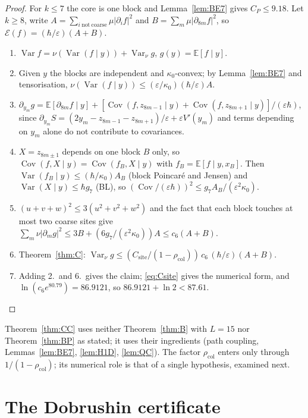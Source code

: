 \documentclass[11pt,a4paper]{article}
\theoremstyle{definition}
\theoremstyle{remark}
\newcommand{\E}{\mathbb{E}}
\newcommand{\Var}{\operatorname{Var}}
\newcommand{\Cov}{\operatorname{Cov}}
\newcommand{\cE}{\mathcal{E}}
\newcommand{\rcol}{\rho_{\mathrm{col}}}
\newcommand{\Csite}{C_{\mathrm{site}}}
\begin{document}
\begin{proof}
For $k\le7$ the core is one block and Lemma~\ref{lem:BE7} gives $C_P\le9.18$. Let $k\ge8$, write $A=\sum_{i\ \mathrm{not\ coarse}}\mu|\partial_if|^2$ and $B=\sum_m\mu|\partial_{8m}f|^2$, so $\cE(f)=(\hbar/\varepsilon)(A+B)$.
\begin{enumerate}[leftmargin=*,label=\arabic*.]
\item $\Var f=\nu(\Var(f\mid y))+\Var_\nu g$, $g(y)=\E[f\mid y]$.
\item Given $y$ the blocks are independent and $\kappa_0$-convex; by Lemma~\ref{lem:BE7} and tensorisation, $\nu(\Var(f\mid y))\le(\varepsilon/\kappa_0)(\hbar/\varepsilon)A$.
\item $\partial_{y_m}g=\E[\partial_{8m}f\mid y]+[\Cov(f,z_{8m-1}\mid y)+\Cov(f,z_{8m+1}\mid y)]/(\varepsilon\hbar)$, since $\partial_{y_m}S=(2y_m-z_{8m-1}-z_{8m+1})/\varepsilon+\varepsilon V'(y_m)$ and terms depending on $y_m$ alone do not contribute to covariances.
\item $X=z_{8m\pm1}$ depends on one block $B$ only, so $\Cov(f,X\mid y)=\Cov(f_B,X\mid y)$ with $f_B=\E[f\mid y,x_B]$. Then $\Var(f_B\mid y)\le(\hbar/\kappa_0)A_B$ (block Poincar\'e and Jensen) and $\Var(X\mid y)\le\hbar g_7$ (BL), so $(\Cov/(\varepsilon\hbar))^2\le g_7A_B/(\varepsilon^2\kappa_0)$.
\item $(u+v+w)^2\le3(u^2+v^2+w^2)$ and the fact that each block touches at most two coarse sites give $\sum_m\nu|\partial_mg|^2\le3B+(6g_7/(\varepsilon^2\kappa_0))A\le c_6(A+B)$.
\item Theorem~\ref{thm:C}: $\Var_\nu g\le(\Csite/(1-\rcol))\,c_6\,(\hbar/\varepsilon)(A+B)$.
\item Adding 2.\ and 6.\ gives the claim; \eqref{eq:Csite} gives the numerical form, and $\ln(c_6e^{80.79})=86.9121$, so $86.9121+\ln2<87.61$.\qedhere
\end{enumerate}
\end{proof}

Theorem~\ref{thm:CC} uses neither Theorem~\ref{thm:B} with $L=15$ nor Theorem~\ref{thm:BP} as stated; it uses their ingredients (path coupling, Lemmas~\ref{lem:BE7}, \ref{lem:H1D}, \ref{lem:QC}). The factor $\rcol$ enters only through $1/(1-\rcol)$; its numerical role is that of a single hypothesis, examined next.

\section{The Dobrushin certificate}\label{sec:DOB}
\end{document}
